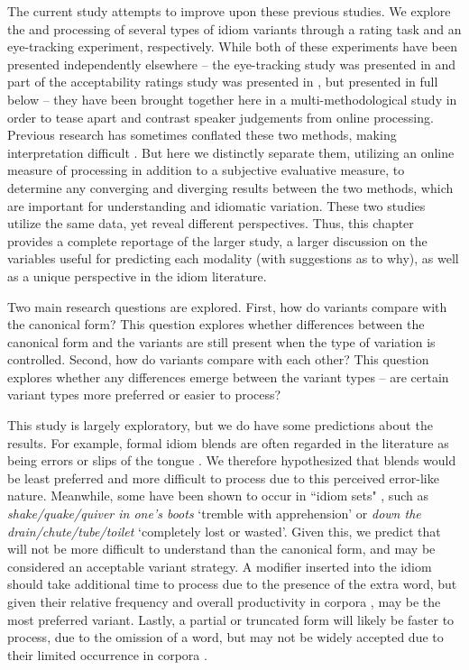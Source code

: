 \documentclass[output=paper
,modfonts
,nonflat]{langsci/langscibook}
\begin{document}
The current study attempts to improve upon these previous studies. We explore the  and processing  of several types of idiom variants  through a rating task and an eye-tracking experiment, respectively. While both of these experiments have been presented independently elsewhere -- the eye-tracking study was presented in \citet{GeeraertEtAl2017b} and part of the acceptability ratings study was presented in \citet{GeeraertEtAl2017}, but presented in full below -- they have been brought together here in a multi-methodological study  in order to tease apart and contrast speaker judgements from online processing. Previous research has sometimes conflated these two methods, making interpretation difficult \citep[cf.][]{GibbsEtAl1989, GibbsNayak1989}. But here we distinctly separate them, utilizing an online measure of processing in addition to a subjective evaluative measure, to determine any converging and diverging results between the two methods, which are important for understanding  and idiomatic variation. These two studies utilize the same data, yet reveal different perspectives. Thus, this chapter provides a complete reportage of the larger study, a larger discussion on the variables useful for predicting each modality (with suggestions as to why), as well as a unique perspective in the idiom literature.

Two main research questions are explored. First, how do variants compare with the canonical form? This question explores whether differences between the canonical form and the variants are still present when the type of variation is controlled. Second, how do variants compare with each other? This question explores whether any differences emerge between the variant types -- are certain variant types more preferred or easier to process?

This study is largely exploratory, but we do have some predictions about the results. For example, formal idiom blends  are often regarded in the literature as being errors or slips of the tongue \citep{Fay1982, CuttingBock1997}. We therefore hypothesized that blends would be least preferred and more difficult to process due to this perceived error-like nature. Meanwhile, some  have been shown to occur in ``idiom sets" \citep{Moon1998}, such as \textit{shake/quake/quiver in one's boots} `tremble with apprehension' or \textit{down the drain/chute/tube/toilet} `completely lost or wasted'. Given this, we predict that  will not be more difficult to understand  than the canonical form, and may be considered an acceptable  variant strategy.  A modifier inserted into the idiom  should take additional time to process due to the presence of the extra word, but given their relative frequency and overall productivity in corpora \citep{Moon1998, Schroder2013}, may be the most preferred variant. Lastly, a partial or truncated form  will likely be faster to process, due to the omission of a word, but may not be widely accepted due to their limited occurrence in corpora \citep{Moon1998}.
\end{document}
